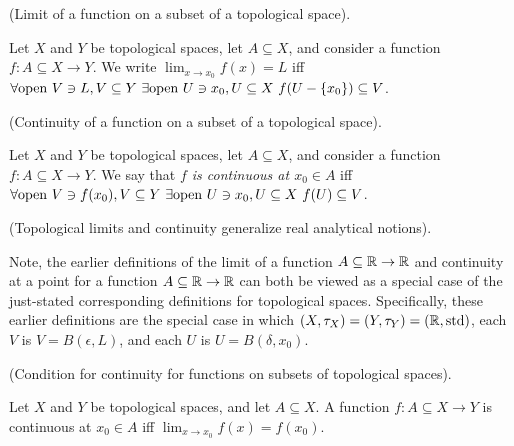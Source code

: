 
\begin{defn}
    (Limit of a function on a subset of a topological space).
    
    Let $X$ and $Y$ be topological spaces, let $A \subseteq X$, and consider a function $f:A \subseteq X \rightarrow Y$. We write $\lim_{x \rightarrow x_0} f(x) = L$ iff 
    $\forall \text{open } V \ni L, V \subseteq Y  \text{ } \exists \text{open } U \ni x_0, U \subseteq X \text{ } f(U - \{x_0\}) \subseteq V$.
    
\end{defn}

\begin{defn}
    (Continuity of a function on a subset of a topological space).
    
    Let $X$ and $Y$ be topological spaces, let $A \subseteq X$, and consider a function $f:A \subseteq X \rightarrow Y$.  We say that \textit{$f$ is continuous at $x_0 \in A$} iff $\forall \text{open } V \ni f(x_0), V \subseteq Y \text{ } \exists \text{open } U \ni x_0, U \subseteq X \text{ } f(U) \subseteq V$.
\end{defn}

\begin{remark}
    (Topological limits and continuity generalize real analytical notions).

    Note, the earlier definitions of the limit of a function $A \subseteq \mathbb{R} \rightarrow \mathbb{R}$ and continuity at a point for a function $A \subseteq \mathbb{R} \rightarrow \mathbb{R}$ can both be viewed as a special case of the just-stated corresponding definitions for topological spaces. Specifically, these earlier definitions are the special case in which $(X, \tau_X) = (Y, \tau_Y) = (\mathbb{R}, \text{std})$, each $V$ is $V = B(\epsilon, L)$, and each $U$ is $U = B(\delta, x_0)$.
\end{remark}

\begin{theorem}
    (Condition for continuity for functions on subsets of topological spaces).
    
    Let $X$ and $Y$ be topological spaces, and let $A \subseteq X$. A function $f:A \subseteq X \rightarrow Y$ is continuous at $x_0 \in A$ iff $\lim_{x \rightarrow x_0} f(x) = f(x_0)$.
\end{theorem}

